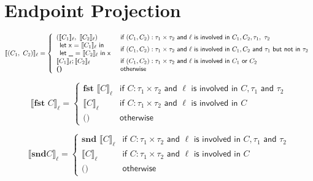 \documentclass{article}
\begin{document}
\section{Endpoint Projection}

$$
 \llbracket     (C_1, \ C_2) \rrbracket _\ell = \left\{
    \begin{array}{l l}
    (\llbracket     C_1 \rrbracket _\ell ,\  \llbracket     C_2 \rrbracket _\ell)  & 
    \textsf{if } (C_1, C_2) : \tau_1 \times \tau_2 \textsf{ and } \ell \textsf{ is involved in } C_1,  C_2, \tau_1, \ \tau_2 \\
    \begin{array}{l}
    \textsf{let x = } \llbracket C_1 \rrbracket _\ell \textsf{ in} \\
    \textsf{let \_ = } \llbracket C_2 \rrbracket _\ell \textsf{ in x}
    \end{array} & \textsf{if } (C_1, C_2) : \tau_1 \times \tau_2 \textsf{ and } \ell \textsf{ is involved in } C_1, C_2 \textsf{ and } \tau_1 \textsf{ but not in } \tau_2  \\
    \llbracket     C_1 \rrbracket _\ell; \llbracket     C_2 \rrbracket _\ell & \textsf{if } (C_1, C_2) : \tau_1 \times \tau_2 \textsf{ and } \ell \textsf{ is involved in }  C_1 \textsf{ or }  C_2 \\ 
    \textbf{()} & \textsf{otherwise}
    \end{array}
\right.
$$

$$
 \llbracket  \textbf{fst } C \rrbracket _\ell = \left\{
    \begin{array}{ll}
    \textbf{fst }\llbracket     C \rrbracket _\ell & \textsf{if } C : \tau_1 \times \tau_2 \textsf{ and } \ell \textsf{ is involved in } C,  \tau_1 \textsf{ and } \tau_2\\
    \llbracket C \rrbracket _\ell & \textsf{if } C : \tau_1 \times \tau_2 \textsf{ and } \ell \textsf{ is involved in } C  \\
    \textbf{()} & \textsf{otherwise}
    \end{array}
\right.
$$

$$
 \llbracket  \textbf{snd} C \rrbracket _\ell = \left\{
    \begin{array}{ll}
    \textbf{snd }\llbracket     C \rrbracket _\ell & \textsf{if } C : \tau_1 \times \tau_2 \textsf{ and } \ell \textsf{ is involved in } C,  \tau_1 \textsf{ and } \tau_2\\
    \llbracket C \rrbracket _\ell & \textsf{if } C : \tau_1 \times \tau_2 \textsf{ and } \ell \textsf{ is involved in } C  \\
    \textbf{()} & \textsf{otherwise}
    \end{array}
\right.
$$
\end{document}
